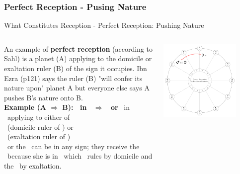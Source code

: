 \subsubsection{Perfect Reception - Pusing Nature}
\begin{frame}[t]{What Constitutes Reception - Perfect Reception: Pushing Nature}
\vspace{0.1cm}
\begin{columns}[T, onlytextwidth]
An example of \textbf{perfect reception} (according to Sahl) is a planet (A) applying to the domicile or exaltation ruler (B) of the sign it occupies. Ibn Ezra (p121) says the ruler (B) "will confer its nature upon" planet A but everyone else says A pushes B's nature onto B.  \\
\vspace{0.2cm}
\textbf{Example (A $\Rightarrow$ B): \Moon\ in \Aries\ $\Rightarrow$ \Mars\ or \Sun} 
\ul
\vspace{0.2cm}
\Moon\ in \Aries\ applying to either of \\
\Mars\ (domicile ruler of \Aries) or \\
\Sun\ (exaltation ruler of \Aries) \\
\vspace{0.2cm}
\Mars\ or the \Sun\ can be in any sign; they receive the \Moon\ because she is in \Aries\ which \Mars\ rules by domicile and the \Sun\ by exaltation.\\


\begin{center}
{\includegraphics[width=0.8\textwidth]{charts/01-perfect-reception}} \\
\end{center}

\end{columns}
\vspace{0.2cm}
\end{frame}
